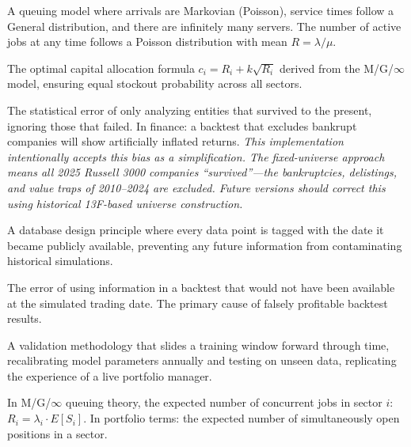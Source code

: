\documentclass[11pt, oneside]{book}
\begin{document}
\begin{description}[leftmargin=3cm, style=nextline]
    \item[\textbf{M/G/$\infty$ Queue}] A queuing model where arrivals are Markovian (Poisson), service times follow a General distribution, and there are infinitely many servers. The number of active jobs at any time follows a Poisson distribution with mean $R = \lambda/\mu$.

    \item[\textbf{Square-Root Rule}] The optimal capital allocation formula $c_i = R_i + k\sqrt{R_i}$ derived from the M/G/$\infty$ model, ensuring equal stockout probability across all sectors.

    \item[\textbf{Survivorship Bias}] The statistical error of only analyzing entities that survived to the present, ignoring those that failed. In finance: a backtest that excludes bankrupt companies will show artificially inflated returns. \textit{This implementation intentionally accepts this bias as a simplification. The fixed-universe approach means all 2025 Russell 3000 companies ``survived''---the bankruptcies, delistings, and value traps of 2010--2024 are excluded. Future versions should correct this using historical 13F-based universe construction.}

    \item[\textbf{Point-in-Time (PiT)}] A database design principle where every data point is tagged with the date it became publicly available, preventing any future information from contaminating historical simulations.

    \item[\textbf{Look-Ahead Bias}] The error of using information in a backtest that would not have been available at the simulated trading date. The primary cause of falsely profitable backtest results.

    \item[\textbf{Walk-Forward Optimization (WFO)}] A validation methodology that slides a training window forward through time, recalibrating model parameters annually and testing on unseen data, replicating the experience of a live portfolio manager.

    \item[\textbf{Offered Load ($R_i$)}] In M/G/$\infty$ queuing theory, the expected number of concurrent jobs in sector $i$: $R_i = \lambda_i \cdot E[S_i]$. In portfolio terms: the expected number of simultaneously open positions in a sector.


\end{description}
\end{document}
